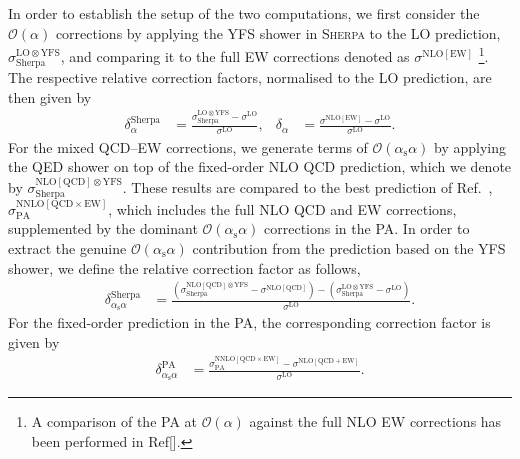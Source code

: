 \documentclass[11pt]{cernrep}
\newcommand{\order}{\ensuremath{\mathcal{O}}}
\newcommand{\alphas}{\ensuremath{\alpha_\mathrm{s}}}
\newcommand{\rLO}{\ensuremath{\mathrm{LO}}}
\newcommand{\rNLO}{\ensuremath{\mathrm{NLO}}}
\newcommand{\rNNLO}{\ensuremath{\mathrm{NNLO}}}
\newcommand{\rQCD}{\ensuremath{\mathrm{QCD}}}
\newcommand{\rEW}{\ensuremath{\mathrm{EW}}}
\newcommand{\rYFS}{\ensuremath{\mathrm{YFS}}}
\newcommand{\rSherpa}{\ensuremath{\mathrm{Sherpa}}}
\newcommand{\rPA}{\ensuremath{\mathrm{PA}}}
\begin{document}
In order to establish the setup of the two computations, we first consider the $\order(\alpha)$ corrections by applying the YFS shower in \textsc{Sherpa} to the LO prediction, $\sigma^{\rLO\otimes\rYFS}_\rSherpa$, and comparing it to the full EW corrections denoted as $\sigma^{\rNLO[\rEW]}$%
\footnote{
  A comparison of the PA at $\order(\alpha)$ against the full NLO EW corrections has been performed in Ref[].
}.
The respective relative correction factors, normalised to the LO prediction, are then given by
\begin{align}
  \label{eq:delta:nlo}
  \delta_\alpha^\rSherpa &= 
  \frac{\sigma^{\rLO\otimes\rYFS}_\rSherpa - \sigma^\rLO}{\sigma^\rLO}
  , &
  \delta_\alpha &= 
  \frac{\sigma^{\rNLO[\rEW]} - \sigma^\rLO}{\sigma^\rLO}
  .
\end{align}
For the mixed QCD--EW corrections, we generate terms of $\order(\alphas\alpha)$ by applying the QED shower on top of the fixed-order NLO QCD prediction, which we denote by $\sigma^{\rNLO[\rQCD]\otimes\rYFS}_\rSherpa$.
These results are compared to the best prediction of Ref.~\cite{Dittmaier:2015rxo}, $\sigma^{\rNNLO[\rQCD\times\rEW]}_{\rPA}$, which includes the full NLO QCD and EW corrections, supplemented by the dominant $\order(\alphas\alpha)$ corrections in the PA.
In order to extract the genuine $\order(\alphas\alpha)$ contribution from the prediction based on the YFS shower, we define the relative correction factor as follows,
\begin{align}
  \label{eq:delta:nnlo:sherpa}
  \delta_{\alphas\alpha}^\rSherpa &= 
  \frac{ (\sigma^{\rNLO[\rQCD]\otimes\rYFS}_\rSherpa - \sigma^{\rNLO[\rQCD]}) 
        -(\sigma^{\rLO\otimes\rYFS}_\rSherpa - \sigma^\rLO)}
       {\sigma^\rLO} .
\end{align}
For the fixed-order prediction in the PA, the corresponding correction factor is given by
\begin{align}
  \label{eq:delta:nnlo:pa}
  \delta_{\alphas\alpha}^\rPA &= 
    \frac{\sigma^{\rNNLO[\rQCD\times\rEW]}_{\rPA} - \sigma^{\rNLO[\rQCD+\rEW]}}
       {\sigma^\rLO} .
\end{align}
\end{document}
